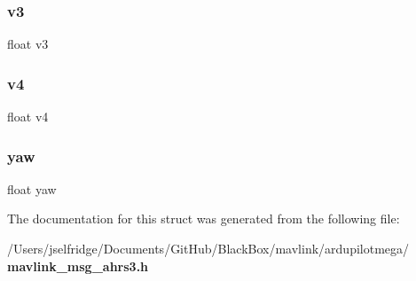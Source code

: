 \mbox{\label{struct____mavlink__ahrs3__t_a6aac66c9580e284eb2b77bb90c4a53c1}} 
\subsubsection{v3}
{\footnotesize\ttfamily float v3}

\mbox{\label{struct____mavlink__ahrs3__t_a2d7ae18d6eda01063702c192b411954d}} 
\subsubsection{v4}
{\footnotesize\ttfamily float v4}

\mbox{\label{struct____mavlink__ahrs3__t_a7efc219781df4a1e281cb5d348b7fbf9}} 
\subsubsection{yaw}
{\footnotesize\ttfamily float yaw}



The documentation for this struct was generated from the following file\+:\begin{DoxyCompactItemize}
\item 
/\+Users/jselfridge/\+Documents/\+Git\+Hub/\+Black\+Box/mavlink/ardupilotmega/\textbf{ mavlink\+\_\+msg\+\_\+ahrs3.\+h}\end{DoxyCompactItemize}
